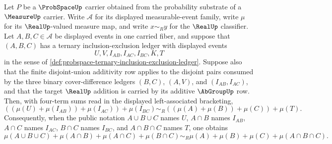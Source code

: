 \begin{theorem}
\label{thm:probspace-ternary-inclusion-exclusion-identity}
Let $P$ be a $\ProbSpaceUp$ carrier obtained from the probability substrate of a $\MeasureUp$ carrier. Write $\mathcal A$ for its displayed measurable-event family, write $\mu$ for its $\RealUp$-valued measure map, and write $x\sim_R y$ for the $\RealUp$ classifier. Let $A,B,C\in\mathcal A$ be displayed events in one carried fiber, and suppose that $(A,B,C)$ has a ternary inclusion-exclusion ledger with displayed events
$$
U,V,I_{AB},I_{AC},I_{BC},K,T
$$
in the sense of \autoref{def:probspace-ternary-inclusion-exclusion-ledger}. Suppose also that the finite disjoint-union additivity row applies to the disjoint pairs consumed by the three binary cover-difference ledgers $(B,C)$, $(A,V)$, and $(I_{AB},I_{AC})$, and that the target $\RealUp$ addition is carried by its additive $\AbGroupUp$ row. Then, with four-term sums read in the displayed left-associated bracketing,
$$
((\mu(U)+\mu(I_{AB}))+\mu(I_{AC}))+\mu(I_{BC})\sim_R((\mu(A)+\mu(B))+\mu(C))+\mu(T).
$$
Consequently, when the public notation $A\cup B\cup C$ names $U$, $A\cap B$ names $I_{AB}$, $A\cap C$ names $I_{AC}$, $B\cap C$ names $I_{BC}$, and $A\cap B\cap C$ names $T$, one obtains
$$
\mu(A\cup B\cup C)+\mu(A\cap B)+\mu(A\cap C)+\mu(B\cap C)\sim_R\mu(A)+\mu(B)+\mu(C)+\mu(A\cap B\cap C).
$$
\end{theorem}
